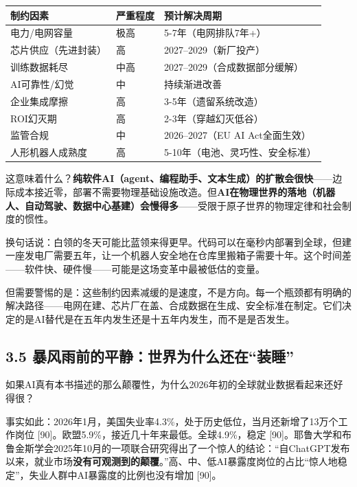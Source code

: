 \documentclass[11pt,a4paper]{ctexart}
\begin{document}
\begin{center}

\begin{tabularx}{\textwidth}{lXX}
\toprule
制约因素 & 严重程度 & 预计解决周期 \\
\midrule
电力/电网容量 & 极高 & 5-7年（电网排队7年+） \\
芯片供应（先进封装） & 高 & 2027--2029（新厂投产） \\
训练数据耗尽 & 中高 & 2027--2029（合成数据部分缓解） \\
AI可靠性/幻觉 & 中 & 持续渐进改善 \\
企业集成摩擦 & 高 & 3-5年（遗留系统改造） \\
ROI幻灭期 & 高 & 2-3年（穿越幻灭低谷） \\
监管合规 & 中 & 2026--2027（EU AI Act全面生效） \\
人形机器人成熟度 & 高 & 5-10年（电池、灵巧性、安全标准） \\
\bottomrule
\end{tabularx}
\end{center}

这意味着什么？\textbf{纯软件AI（agent、编程助手、文本生成）的扩散会很快}——边际成本接近零，部署不需要物理基础设施改造。但\textbf{AI在物理世界的落地（机器人、自动驾驶、数据中心基建）会慢得多}——受限于原子世界的物理定律和社会制度的惯性。

换句话说：白领的冬天可能比蓝领来得更早。代码可以在毫秒内部署到全球，但建一座发电厂需要五年，让一个机器人安全地在仓库里搬箱子需要十年。这个时间差——软件快、硬件慢——可能是这场变革中最被低估的变量。

但需要警惕的是：这些制约因素减缓的是速度，不是方向。每一个瓶颈都有明确的解决路径——电网在建、芯片厂在盖、合成数据在生成、安全标准在制定。它们决定的是AI替代是在五年内发生还是十五年内发生，而不是是否发生。

\subsection{3.5 暴风雨前的平静：世界为什么还在“装睡”}

如果AI真有本书描述的那么颠覆性，为什么2026年初的全球就业数据看起来还好得很？

事实如此：2026年1月，美国失业率4.3\%，处于历史低位，当月还新增了13万个工作岗位 [90]。欧盟5.9\%，接近几十年来最低。全球4.9\%，稳定 [90]。耶鲁大学和布鲁金斯学会2025年10月的一项联合研究得出了一个惊人的结论：“自ChatGPT发布以来，就业市场\textbf{没有可观测到的颠覆}。”高、中、低AI暴露度岗位的占比“惊人地稳定”，失业人群中AI暴露度的比例也没有增加 [90]。
\end{document}
